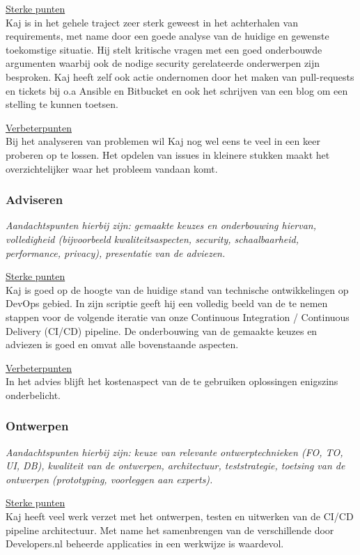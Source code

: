 \underline{Sterke punten}\\[0.1cm]
Kaj is in het gehele traject zeer sterk geweest in het achterhalen van requirements, met name door een goede analyse van de huidige en gewenste toekomstige situatie. Hij stelt kritische vragen met een goed onderbouwde argumenten waarbij ook de nodige security gerelateerde onderwerpen zijn besproken. Kaj heeft zelf ook actie ondernomen door het maken van pull-requests en tickets bij o.a Ansible en Bitbucket en ook het schrijven van een blog om een stelling te kunnen toetsen.

\underline{Verbeterpunten}\\[0.1cm]
Bij het analyseren van problemen wil Kaj nog wel eens te veel in een keer proberen op te lossen. Het opdelen van issues in kleinere stukken maakt het overzichtelijker waar het probleem vandaan komt.



\subsubsection{Adviseren}
\textit{Aandachtspunten hierbij zijn: gemaakte keuzes en onderbouwing hiervan, volledigheid (bijvoorbeeld kwaliteitsaspecten, security, schaalbaarheid, performance, privacy), presentatie van de adviezen.}


\underline{Sterke punten}\\[0.1cm]
Kaj is goed op de hoogte van de huidige stand van technische ontwikkelingen op DevOps gebied. In zijn scriptie geeft hij een volledig beeld van de te nemen stappen voor de volgende iteratie van onze Continuous Integration / Continuous Delivery (CI/CD) pipeline. De onderbouwing van de gemaakte keuzes en adviezen is goed en omvat alle bovenstaande aspecten.

\underline{Verbeterpunten}\\[0.1cm]
In het advies blijft het kostenaspect van de te gebruiken oplossingen enigszins onderbelicht. 


\subsubsection{Ontwerpen}
\textit{Aandachtspunten hierbij zijn: keuze van relevante ontwerptechnieken (FO, TO, UI, DB), kwaliteit van de ontwerpen, architectuur, teststrategie, toetsing van de ontwerpen (prototyping, voorleggen aan experts).}

\underline{Sterke punten}\\[0.1cm]
Kaj heeft veel werk verzet met het ontwerpen, testen en uitwerken van de CI/CD pipeline architectuur. Met name het samenbrengen van de verschillende door Developers.nl beheerde applicaties in een werkwijze is waardevol. 

